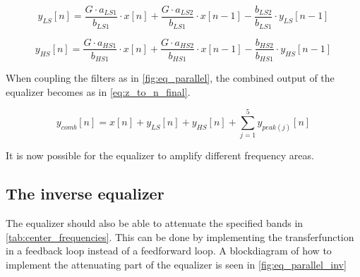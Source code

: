 \begin{equation}\label{eq:z_to_n_LS}
        y_{LS}[n] = \frac{G \cdot a_{LS1}}{b_{LS1}} \cdot x[n] + \frac{G \cdot a_{LS2}}{b_{LS1}} \cdot x[n-1] -  \frac{b_{LS2}}{b_{LS1}} \cdot y_{LS}[n-1]
    \end{equation}

\begin{equation}\label{eq:z_to_n_HS}
        y_{HS}[n] = \frac{G \cdot a_{HS1}}{b_{HS1}} \cdot x[n] + \frac{G \cdot a_{HS2}}{b_{HS1}} \cdot x[n-1] -  \frac{b_{HS2}}{b_{HS1}} \cdot y_{HS}[n-1]
    \end{equation}

When coupling the filters as in \autoref{fig:eq_parallel}, the combined output of the equalizer becomes as in \autoref{eq:z_to_n_final}.

\begin{equation}\label{eq:z_to_n_final}
        y_{comb}[n] = x[n] + y_{LS}[n] + y_{HS}[n] + \sum_{j=1}^{5} y_{peak(j)}[n]
    \end{equation}

It is now possible for the equalizer to amplify different frequency areas.

\subsection{The inverse equalizer}
The equalizer should also be able to attenuate the specified bands in \autoref{tab:center_frequencies}. 
This can be done by implementing the transferfunction in a feedback loop instead of a feedforward loop. A blockdiagram of how to implement the attenuating part of the equalizer is seen in \autoref{fig:eq_parallel_inv}

